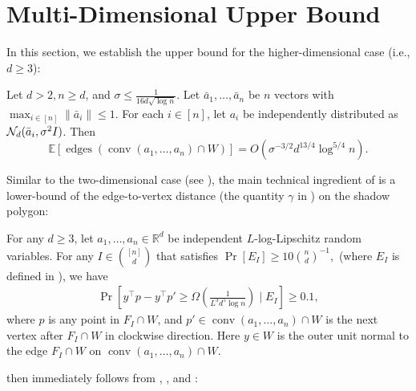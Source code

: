 \documentclass{theoretics}
\newcommand{\R}{\mathbb R}
\newcommand{\E}{\mathbb E}
\newcommand{\conv}{\operatorname{conv}}
\newcommand{\edges}{\operatorname{edges}}
\begin{document}
\section{Multi-Dimensional Upper Bound}\label{sec:ub-multi-new}


In this section, we establish the upper bound for the higher-dimensional case (i.e., $d \geq 3$):
\begin{theorem}\label{thm:ub-multi}
    Let $d > 2, n \geq d$, and $\sigma \leq \frac{1}{16d\sqrt{\log n}}$.
    Let $\bar{a}_1, \ldots, \bar{a}_n$ be $n$ vectors with $\max_{i \in [n]} \|\bar{a}_i\| \leq 1$. For each $i \in [n]$, let $a_i$ be independently distributed as
    $\mathcal{N}_d(\Bar{a}_i, \sigma^2 I)$. Then
    \begin{equation}\label{eq:ub-multi}
        \E[\edges( \conv(a_1,\dots,a_n) \cap W)] = O\left( \sigma^{-3/2} d^{13/4} \log^{5/4} n \right).
    \end{equation}
\end{theorem}

Similar to the two-dimensional case (see ), the main technical ingredient of  is a lower-bound of the edge-to-vertex distance (the quantity $\gamma$ in ) on the shadow polygon:

\begin{lemma}\label{lem:normalvector}
    For any $d \geq 3$,
    let $a_1, \ldots, a_n \in \R^d$ be independent $L$-log-Lipschitz random variables.
    For any $I \in \binom{[n]}{d}$ that satisfies
    \(
    \Pr[E_I] \geq 10\binom{n}{d}^{-1},
    \)
    (where $E_I$ is defined in ),
    we have
    \begin{align*}
        \Pr[y^\top p - y^\top p' \geq  \Omega(\frac{1}{L^3d^5 \log n})\mid E_I ] \geq 0.1,
    \end{align*}
    where $p$ is any point in $F_I \cap W$, and $p' \in \conv(a_1,\dots,a_n)\cap W$ is the next vertex after $F_I \cap W$ in clockwise direction.
    Here $y \in W$ is the outer unit normal to the edge $F_I \cap W$ on $\conv(a_1, \ldots, a_n) \cap W$.
\end{lemma}

 then immediately follows from , ,  and :
\end{document}

